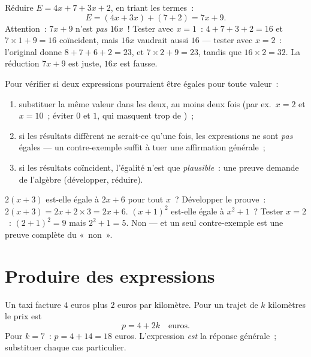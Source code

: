 \begin{example}\label{ex:g7:literal:reduce}
Réduire $E = 4x + 7 + 3x + 2$, en triant les termes~:
\[
E = (4x + 3x) + (7 + 2) = 7x + 9 .
\]
Attention~: $7x + 9$ n'est \emph{pas} $16x$~! Tester avec $x = 1$~:
$4 + 7 + 3 + 2 = 16$ et $7 \times 1 + 9 = 16$ coïncident, mais $16x$
vaudrait aussi $16$ --- tester avec $x = 2$~: l'original donne
$8 + 7 + 6 + 2 = 23$, et $7 \times 2 + 9 = 23$, tandis que
$16 \times 2 = 32$. La réduction $7x + 9$ est juste, $16x$ est
fausse.
\end{example}

\begin{method}\label{met:g7:literal:test}
Pour vérifier si deux expressions pourraient être égales pour toute
valeur~:
\begin{enumerate}
  \item substituer la même valeur dans les deux, au moins deux fois
        (par ex.\ $x = 2$ et $x = 10$~; éviter $0$ et $1$, qui
        masquent trop de )~;
  \item si les résultats diffèrent ne serait-ce qu'une fois, les
        expressions ne sont \emph{pas} égales --- un contre-exemple
        suffit à tuer une affirmation générale~;
  \item si les résultats coïncident, l'égalité n'est que
        \emph{plausible}~: une preuve demande de l'algèbre
        (développer, réduire).
\end{enumerate}
\end{method}

\begin{example}\label{ex:g7:literal:test}
$2(x + 3)$ est-elle égale à $2x + 6$ pour tout $x$~? Développer le
prouve~: $2(x+3) = 2x + 2 \times 3 = 2x + 6$. $(x + 1)^2$ est-elle
égale à $x^2 + 1$~? Tester $x = 2$~: $(2+1)^2 = 9$ mais
$2^2 + 1 = 5$. Non --- et un seul contre-exemple est une preuve
complète du «~non~».
\end{example}

\section{Produire des expressions}

\begin{example}\label{ex:g7:literal:produce}
Un taxi facture $4$ euros plus $2$ euros par kilomètre. Pour un
trajet de $k$ kilomètres le prix est
\[
p = 4 + 2k \quad\text{euros}.
\]
Pour $k = 7$~: $p = 4 + 14 = 18$ euros. L'expression \emph{est} la
réponse générale~; substituer  chaque cas particulier.
\end{example}

